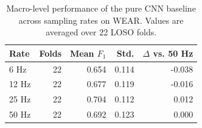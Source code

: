 \begin{table}[t]
  \centering
  \small
  \caption{Macro-level performance of the pure CNN baseline across sampling rates on WEAR. Values are averaged over 22 LOSO folds.}
  \label{tab:standard_cnn_nolstm_macro_wear}
  \begin{tabular}{lrrrr}
    \toprule
    Rate & Folds & Mean $F_1$ & Std. & $\Delta$ vs. 50 Hz \\
    \midrule
    6 Hz & 22 & 0.654 & 0.114 & -0.038 \\
    12 Hz & 22 & 0.677 & 0.119 & -0.016 \\
    25 Hz & 22 & 0.704 & 0.112 & 0.012 \\
    50 Hz & 22 & 0.692 & 0.123 & 0.000 \\
    \bottomrule
  \end{tabular}
\end{table}
